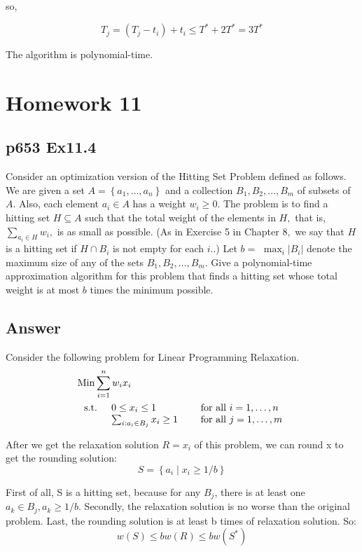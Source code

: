 \documentclass[a4paper]{article}
\begin{document}
so,

$$
	T_j = (T_{j}-t_{i}) + t_i \leq T^* + 2T^* = 3T^*
$$

The algorithm is polynomial-time.



\newpage
\section*{Homework 11}
\subsection*{p653 Ex11.4}
\begin{adjustwidth}{1cm}{1cm}
	Consider an optimization version of the Hitting Set Problem defined as follows. We are given a set $A=\left\{a_{1}, \ldots, a_{n}\right\}$ and a collection $B_{1}, B_{2}, \ldots, B_{m}$ of subsets of $A$. Also, each element $a_{i} \in A$ has a weight $w_{i} \geq 0 .$ The problem is to find a hitting set $H \subseteq A$ such that the total weight of the elements in $H,$ that is, $\sum_{a_{i} \in H} w_{i},$ is as small as possible. (As in Exercise 5 in Chapter $8,$ we say that $H$ is a hitting set if $H \cap B_{i}$ is not empty for each $i .$.) Let $b=$ $\max _{i}\left|B_{i}\right|$ denote the maximum size of any of the sets $B_{1}, B_{2}, \ldots, B_{m} .$ Give a polynomial-time approximation algorithm for this problem that finds
	a hitting set whose total weight is at most $b$ times the minimum possible.
\end{adjustwidth}

\subsection*{Answer}
Consider the following problem for Linear Programming Relaxation.
$$
	\begin{aligned}
		 & \operatorname{Min} \sum_{i=1}^{n} w_{i} x_{i} \\
		 & \begin{array}{l@{\quad}l@{\quad}l}
			\text { s.t. } & 0 \leq x_{i} \leq 1                          & \text { for all } i=1, \ldots, n \\
			               & \sum_{i: a_{i} \in B_{j}} x_{i} \geq 1 \quad &
			\text { for all } j=1, \ldots, m                                                                 \\
		\end{array}
	\end{aligned}
$$
\par After we get the relaxation solution $R = {x_i}$ of this problem, we can round x to get the rounding solution:
$$
	S=\left\{a_{i} \mid x_{i} \geq 1 / b\right\}
$$
\par First of all, S is a hitting set, because for any $B_j$, there is at least one $a_k \in B_j, a_k \geq 1/b$. Secondly, the relaxation solution is no worse than the original problem. Last, the rounding solution is at least b times of relaxation solution. So:
$$
	w(S) \leq b w(R) \leq bw(S^*)
$$
\end{document}
